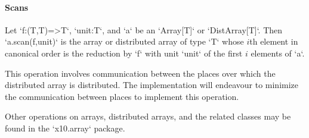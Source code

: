 \paragraph{Scans}\label{ArrayScans}


Let \xcd`f:(T,T)=>T`, \xcd`unit:T`, and \xcd`a` be an \xcd`Array[T]` or
\xcd`DistArray[T]`.  Then \xcd`a.scan(f,unit)` is the array or distributed
array of type \xcd`T` whose {$i$}th element in canonical order is the
reduction by \xcd`f` with unit \xcd`unit` of the first {$i$} elements of
\xcd`a`. 


This operation involves communication between the places over which the
distributed array is distributed. The \Xten{} implementation will endeavour to
minimize the communication between places to implement this operation.

Other operations on arrays, distributed arrays, and the related classes may be
found in the \xcd`x10.array` package.
